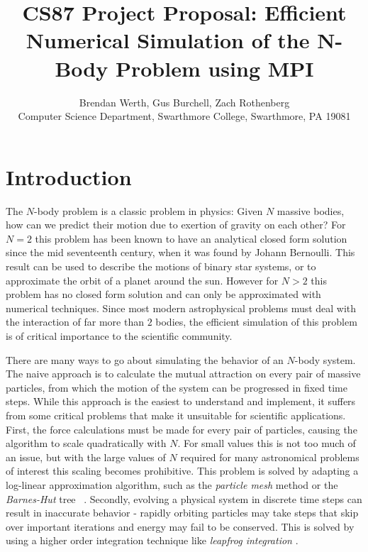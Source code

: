\documentclass[11pt]{article}
\begin{document}

\title{CS87 Project Proposal: 
Efficient Numerical Simulation of the N-Body Problem using MPI}

\author{Brendan Werth, Gus Burchell, Zach Rothenberg\\
Computer Science Department, Swarthmore College, Swarthmore, PA  19081}

\maketitle

\section {Introduction}\label{intro}
The $N$-body problem is a classic problem in physics: Given $N$ massive bodies, how can we predict their motion due to exertion of gravity on each other? For $N = 2$ this problem has been known to have an analytical closed form solution since the mid seventeenth century, when it was found by Johann Bernoulli. This result can be used to describe the motions of binary star systems, or to approximate the orbit of a planet around the sun. However for $N > 2$ this problem has no closed form solution and can only be approximated with numerical techniques. Since most modern astrophysical problems must deal with the interaction of far more than $2$ bodies, the efficient simulation of this problem is of critical importance to the scientific community.

There are many ways to go about simulating the behavior of an $N$-body system. The naive approach is to calculate the mutual attraction on every pair of massive particles, from which the motion of the system can be progressed in fixed time steps. While this approach is the easiest to understand and implement, it suffers from some critical problems that make it unsuitable for scientific applications. First, the force calculations must be made for every pair of particles, causing the algorithm to scale quadratically with $N$. For small values this is not too much of an issue, but with the large values of $N$ required for many astronomical problems of interest this scaling becomes prohibitive. This problem is solved by adapting a log-linear approximation algorithm, such as the \emph{particle mesh} method or the \emph{Barnes-Hut} tree ~\cite{barnes-hut}. Secondly, evolving a physical system in discrete time steps can result in inaccurate behavior - rapidly orbiting particles may take steps that skip over important iterations and energy may fail to be conserved. This is solved by using a higher order integration technique like \emph{leapfrog integration} \cite{leapfrog}.
\end{document}
